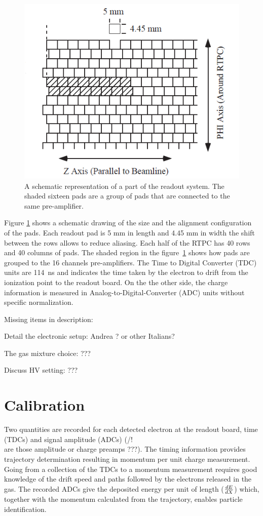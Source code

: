 \documentclass[aps,prl,twocolumn,showpacs,superscriptaddress,groupedaddress]{revtex4}
\begin{document}
\begin{figure}[tb]
   \centering
   \includegraphics[scale=0.55]{fig/PADs.png}
   \caption[]{A schematic representation of a part of the readout system.  The 
   shaded sixteen pads are a group of pads that are connected to the same 
pre-amplifier.} \label{fig:PADs}
\end{figure}

Figure \ref{fig:PADs} shows a schematic drawing of the size and the alignment 
configuration of the pads. Each readout pad is 5 mm in length and 4.45 mm in 
width the shift between the rows allows to reduce aliasing. Each half of the 
RTPC has 40 rows and 40 columns of pads. The shaded region in the 
figure~\ref{fig:PADs} shows how pads are grouped to the 16 channels 
pre-amplifiers. The Time to Digital Converter (TDC) units are 114~ns and 
indicates the time taken by the electron to drift from the ionization point to 
the readout board. On the the other side, the charge information is measured in 
Analog-to-Digital-Converter (ADC) units without specific normalization. 

Missing items in description:

Detail the electronic setup: Andrea ? or other Italians?

The gas mixture choice: ???

Discuss HV setting: ???

\section{Calibration} \label{sec_calib}
Two quantities are recorded for each detected electron at the readout board, 
time (TDCs) and signal amplitude (ADCs) (/!\\ are those amplitude or charge 
preamps ???). The timing information provides trajectory determination 
resulting in momentum per unit charge measurement. Going from a collection of 
the TDCs to a momentum measurement requires good knowledge of the drift speed 
and paths followed by the electrons released in the gas. The recorded ADCs give 
the deposited energy per unit of length ($\small{\frac{dE}{dX}}$) which, 
together with the momentum calculated from the trajectory, enables particle 
identification.
\end{document}
